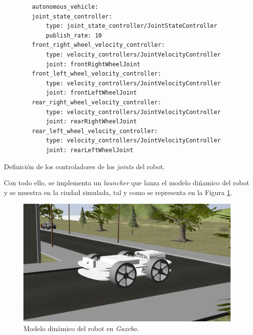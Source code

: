\begin{code}[h]
	\begin{lstlisting}
		autonomous_vehicle:
		joint_state_controller:
			type: joint_state_controller/JointStateController
			publish_rate: 10
		front_right_wheel_velocity_controller:
			type: velocity_controllers/JointVelocityController
			joint: frontRightWheelJoint
		front_left_wheel_velocity_controller:
			type: velocity_controllers/JointVelocityController
			joint: frontLeftWheelJoint
		rear_right_wheel_velocity_controller:
			type: velocity_controllers/JointVelocityController
			joint: rearRightWheelJoint
		rear_left_wheel_velocity_controller:
			type: velocity_controllers/JointVelocityController
			joint: rearLeftWheelJoint
	\end{lstlisting}
	\caption[Definición de los controladores de los \textit{joints} del robot.]{Definición de los controladores de los \textit{joints} del robot.}
	\label{cod:controllers}
\end{code}

Con todo ello, se implementa un \textit{launcher} que lanza el modelo dińamico del robot y se muestra en la ciudad simulada, tal y como se representa en la Figura \ref{fig:modelGazebo}.\\

\begin{figure} [h!]
	\begin{center}
		\includegraphics[width=12cm]{figs/modelGazebo}
	\end{center}
	\caption{Modelo dinámico del robot en \textit{Gazebo}.}
	\label{fig:modelGazebo}
\end{figure}\

